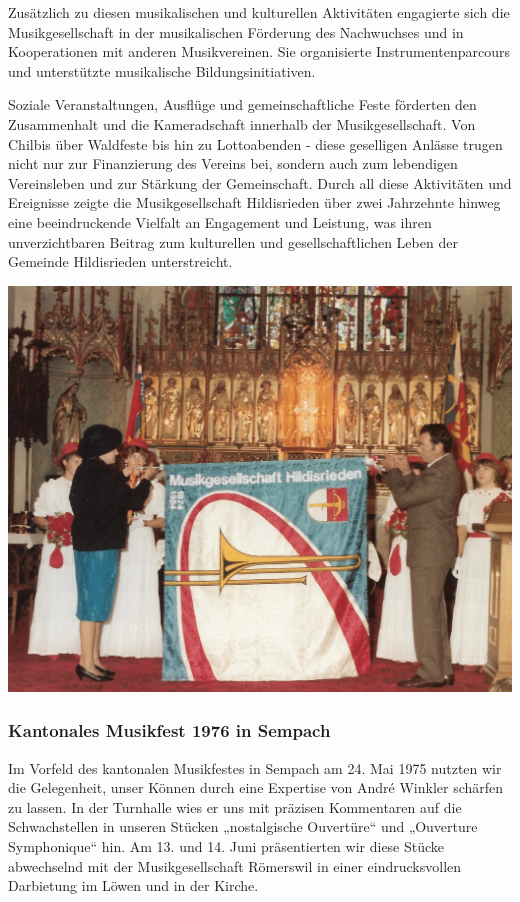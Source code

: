 \begin{history}
    Zusätzlich zu diesen musikalischen und kulturellen Aktivitäten engagierte
    sich die Musikgesellschaft in der musikalischen Förderung des Nachwuchses
    und in Kooperationen mit anderen Musikvereinen. Sie organisierte
    Instrumentenparcours und unterstützte musikalische Bildungsinitiativen.

    Soziale Veranstaltungen, Ausflüge und gemeinschaftliche Feste förderten den
    Zusammenhalt und die Kameradschaft innerhalb der Musikgesellschaft. Von
    Chilbis über Waldfeste bis hin zu Lottoabenden - diese geselligen Anlässe
    trugen nicht nur zur Finanzierung des Vereins bei, sondern auch zum
    lebendigen Vereinsleben und zur Stärkung der Gemeinschaft. Durch all diese
    Aktivitäten und Ereignisse zeigte die Musikgesellschaft Hildisrieden über
    zwei Jahrzehnte hinweg eine beeindruckende Vielfalt an Engagement und
    Leistung, was ihren unverzichtbaren Beitrag zum kulturellen und
    gesellschaftlichen Leben der Gemeinde Hildisrieden unterstreicht.

    \bigbreak

    \begin{MulticolFigure}
        \centering
        \includegraphics[width=0.8\linewidth]{./chap/1975-2000/1984/Fahnenweihe-1984-in-Kirche.jpg}
    \end{MulticolFigure}

    \clearpage

    \subsubsection*{Kantonales Musikfest 1976 in Sempach}

    Im Vorfeld des kantonalen Musikfestes in Sempach am 24. Mai 1975 nutzten wir
    die Gelegenheit, unser Können durch eine Expertise von André Winkler
    schärfen zu lassen. In der Turnhalle wies er uns mit präzisen Kommentaren
    auf die Schwachstellen in unseren Stücken „nostalgische Ouvertüre“ und
    „Ouverture Symphonique“ hin. Am 13. und 14. Juni präsentierten wir diese
    Stücke abwechselnd mit der Musikgesellschaft Römerswil in einer
    eindrucksvollen Darbietung im Löwen und in der Kirche.


\end{history}
